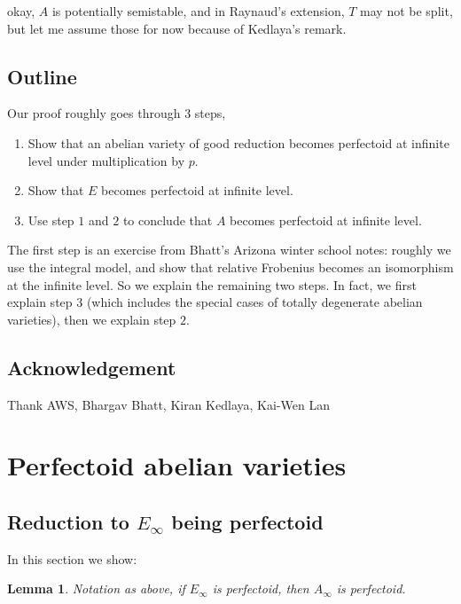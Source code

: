 \documentclass[11pt,oneside]{amsart}
\theoremstyle{theorem}
\newtheorem{lemma}[theorem]{Lemma}
\theoremstyle{definition}
\theoremstyle{remark}
\begin{document}
{\color{red} okay, $A$ is potentially semistable, and in Raynaud's extension, $T$ may not be split, but let me assume those for now because of Kedlaya's remark. }



\subsection{Outline}
Our proof roughly goes through 3 steps, 
\begin{enumerate}
\item Show that an abelian variety of good reduction becomes perfectoid at infinite level under multiplication by $p$. 
\item Show that $E$ becomes perfectoid at infinite level. 
\item Use step $1$ and $2$ to conclude that $A$ becomes perfectoid at infinite level. 
\end{enumerate}

The first step is an exercise from Bhatt's Arizona winter school notes: roughly we use the integral model, and show that relative Frobenius becomes an isomorphism at the infinite level. So we explain the remaining two steps. In fact, we first explain step $3$ (which includes the special cases of totally degenerate abelian varieties), then we explain step $2$. 



\subsection{Acknowledgement}

Thank AWS, Bhargav Bhatt, Kiran Kedlaya, Kai-Wen Lan 





\section{Perfectoid abelian varieties}

\subsection{Reduction to $E_\infty$ being perfectoid}

In this section we show: 

\begin{lemma} \label{lemma:reduction_to_E}
Notation as above, if $E_\infty$ is perfectoid, then $A_\infty$ is perfectoid.  
\end{lemma}
\end{document}
